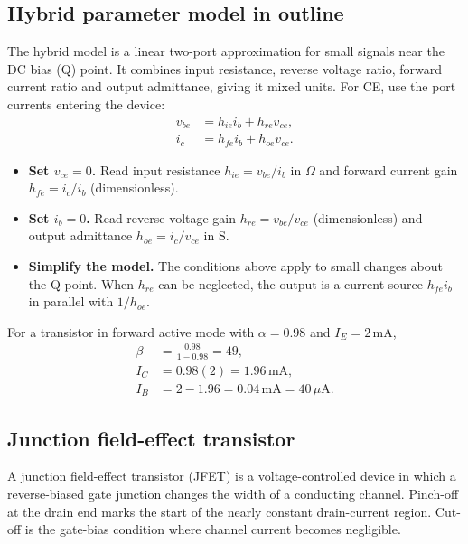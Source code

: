\documentclass[12pt,a4paper]{article}
\begin{document}
\subsection{Hybrid parameter model in outline}
The hybrid model is a linear two-port approximation for small signals near the DC bias (Q) point. It combines input resistance, reverse voltage ratio, forward current ratio and output admittance, giving it mixed units. For CE, use the port currents entering the device:
\[
\begin{aligned}
v_{be}&=h_{ie}i_b+h_{re}v_{ce},\\
i_c&=h_{fe}i_b+h_{oe}v_{ce}.
\end{aligned}
\]
\begin{itemize}[leftmargin=*, itemsep=3pt, topsep=4pt]
  \item \textbf{Set \(v_{ce}=0\).} Read input resistance \(h_{ie}=v_{be}/i_b\) in \(\Omega\) and forward current gain \(h_{fe}=i_c/i_b\) (dimensionless).
  \item \textbf{Set \(i_b=0\).} Read reverse voltage gain \(h_{re}=v_{be}/v_{ce}\) (dimensionless) and output admittance \(h_{oe}=i_c/v_{ce}\) in S.
  \item \textbf{Simplify the model.} The conditions above apply to small changes about the Q point. When \(h_{re}\) can be neglected, the output is a current source \(h_{fe}i_b\) in parallel with \(1/h_{oe}\).
\end{itemize}

\begin{tcolorbox}[examplebox,title={Convert BJT current gains}]
For a transistor in forward active mode with \(\alpha=0.98\) and \(I_E=2\,\mathrm{mA}\),
\[
\begin{aligned}
\beta&=\frac{0.98}{1-0.98}=49,\\
I_C&=0.98(2)=1.96\,\mathrm{mA},\\
I_B&=2-1.96=0.04\,\mathrm{mA}=40\,\mu\mathrm A.
\end{aligned}
\]
\end{tcolorbox}

\subsection{Junction field-effect transistor}
\begin{tcolorbox}[defbox,title={JFET and pinch-off}]
A junction field-effect transistor (JFET) is a voltage-controlled device in which a reverse-biased gate junction changes the width of a conducting channel. Pinch-off at the drain end marks the start of the nearly constant drain-current region. Cut-off is the gate-bias condition where channel current becomes negligible.
\end{tcolorbox}
\end{document}
